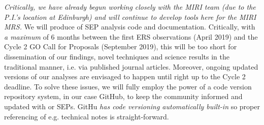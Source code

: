 \noindent
{\it Critically, we have already begun working closely with the MIRI
team (due to the P.I.'s location at Edinburgh) and will continue to
develop tools here for the MIRI MRS.}
We will produce of SEP analysis code and documentation.  Critically,
with {\it a maximum} of 6 months between the first ERS observations
(April 2019) and the Cycle 2 GO Call for Proposals (September 2019),
this will be too short for dissemination of our findings, novel
techniques and science results in the traditional manner, i.e. via
published journal articles. Moreover, ongoing updated versions of our
analyses are envisaged to happen until right up to the Cycle 2
deadline.  To solve these issues, we will fully employ the power of a
code version repository system, in our case GitHub, to keep the
community informed and updated with or SEPs. GitHu {\it has code
versioning automatically built-in} so proper referencing of
e.g. technical notes is straight-forward.






